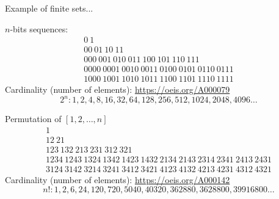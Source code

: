 \documentclass[compress,11pt]{beamer}
\begin{document}
\begin{frame}{Example of finite sets...}

  $n$-bits sequences:
  \begin{gather*}
    0\ 1 \\[4mm]
    00\ 01\ 10\ 11 \\[4mm]
    000\ 001\ 010\ 011\ 100\ 101\ 110\ 111 \\[4mm]
    0000\ 0001\ 0010\ 0011\ 0100\ 0101\ 0110\ 0111 \\
    1000\ 1001\ 1010\ 1011\ 1100\ 1101\ 1110\ 1111
  \end{gather*}
  Cardinality (number of elements): \url{https://oeis.org/A000079}
  \[2^n : 1, 2, 4, 8, 16, 32, 64, 128, 256, 512, 1024, 2048, 4096 \dots\]
\end{frame}


\begin{frame}{Permutation of $[1,2,\dots,n]$}
  \begin{gather*}
    1 \\[4mm]
    12\ 21 \\[4mm]
    123\ 132\ 213\ 231\ 312\ 321 \\[4mm]
    1234\ 1243\ 1324\ 1342\ 1423\ 1432\ 2134\ 2143\ 2314\ 2341\ 2413\ 2431\\
    3124\ 3142\ 3214\ 3241\ 3412\ 3421\ 4123\ 4132\ 4213\ 4231\ 4312\ 4321
  \end{gather*}
  Cardinality (number of elements): \url{https://oeis.org/A000142}
  \[n! : 1, 2, 6, 24, 120, 720, 5040, 40320, 362880, 3628800, 39916800 \dots\]
\end{frame}
\end{document}

